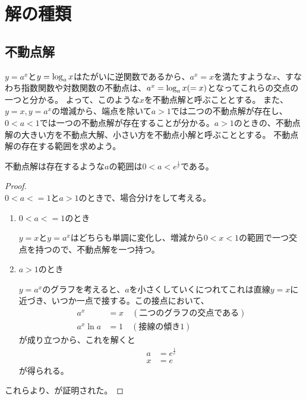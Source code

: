 \section{解の種類}

\subsection{不動点解}
	$y = a^x$と$y = \log_{a} x$はたがいに逆関数であるから、$a^x = x$を満たすような$x$、すなわち指数関数や対数関数の不動点は、$a^x = \log_{a} x( = x)$となってこれらの交点の一つと分かる。
	よって、このような$x$を不動点解と呼ぶこととする。
	また、$y = x,y = a^x$の増減から、端点を除いて$a > 1$では二つの不動点解が存在し、$0 < a < 1$では一つの不動点解が存在することが分かる。$a > 1$のときの、不動点解の大きい方を不動点大解、小さい方を不動点小解と呼ぶこととする。
	不動点解の存在する範囲を求めよう。
	\begin{theorem}
	\label{th:fixed_solutions}
		不動点解は存在するような$a$の範囲は$0 < a < e^\frac{1}{e}$である。
	\end{theorem}
	\begin{proof} \mbox{}\\
		$0 < a <= 1$と$a > 1$のときで、場合分けをして考える。
		\begin{enumerate}
			\item $0 < a <= 1$のとき
			
				$y = x$と$y = a^x$はどちらも単調に変化し、増減から$0 < x < 1$の範囲で一つ交点を持つので、不動点解を一つ持つ。
			\item $a > 1$のとき
			
				$y = a^x$のグラフを考えると、$a$を小さくしていくにつれてこれは直線$y = x$に近づき、いつか一点で接する。この接点において、
				\begin{align*}
					a^x &= x \quad (\text{二つのグラフの交点である}) \\
					a^x\ln{a} &= 1 \quad (\text{接線の傾き1})
				\end{align*}
				が成り立つから、これを解くと
				\begin{align*}
					a &= e^\frac{1}{e} \\
					x &= e 
				\end{align*}
				が得られる。
		\end{enumerate}
		これらより、が証明された。
	\end{proof}

